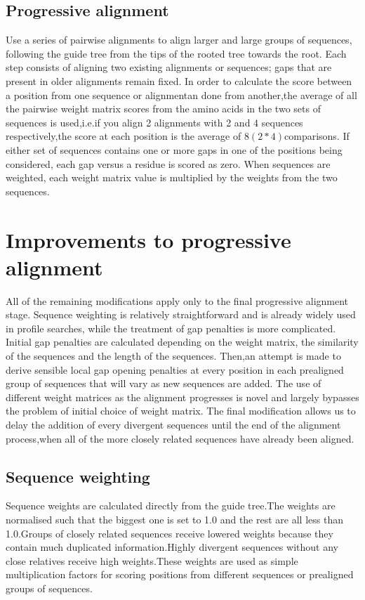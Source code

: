 \subsection{Progressive alignment}
Use a series of pairwise alignments to align larger and large groups of sequences, following the guide tree from the tips of the rooted tree towards the root.
Each step consists of aligning two existing alignments or sequences; gaps that are present in older alignments remain fixed.
In order to calculate the score between a position from one sequence or alignmentan done from another,the average of all the pairwise weight matrix scores from the amino acids in the two sets of sequences is used,i.e.if you align 2 alignments with 2 and 4 sequences respectively,the score at each position is the average of $8(2*4)$comparisons.
If either set of sequences contains one or more gaps in one of the positions being considered, each gap versus a residue is scored as zero.
When sequences are weighted, each weight matrix value is multiplied by the weights from the two sequences.

\section{Improvements to progressive alignment}
All of the remaining modifications apply only to the final progressive alignment stage.
Sequence weighting is relatively straightforward and is already widely used in profile searches, while the treatment of gap penalties is more complicated.
Initial gap penalties are calculated depending on the weight matrix, the similarity of the sequences and the length of the sequences.
Then,an attempt is made to derive sensible local gap opening penalties at every position in each prealigned group of sequences that will vary as new sequences are added. The use of different weight matrices as the alignment progresses is novel and largely  bypasses the problem of initial choice of weight matrix.
The final modification allows us to delay the addition of every divergent sequences until the end of the alignment process,when all of the more closely related sequences have already been aligned.

\subsection{Sequence weighting}
Sequence weights are calculated directly from the guide tree.The weights are normalised  such that the biggest one is set to 1.0 and the rest are all less than 1.0.Groups of closely related sequences receive lowered weights because they contain  much duplicated information.Highly  divergent sequences without any close relatives receive high weights.These weights are used as simple multiplication factors for scoring positions from different sequences or prealigned groups of sequences.

